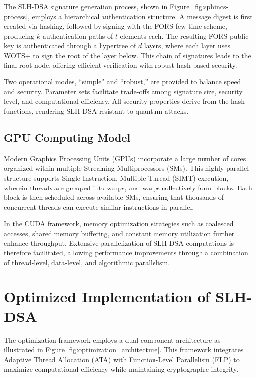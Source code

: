 \documentclass[journal]{IEEEtran}
\begin{document}
The SLH-DSA signature generation process, shown in Figure~\ref{fig:sphincs-process}, employs a hierarchical authentication structure. A message digest is first created via hashing, followed by signing with the FORS few-time scheme, producing $k$ authentication paths of $t$ elements each. The resulting FORS public key is authenticated through a hypertree of $d$ layers, where each layer uses WOTS+ to sign the root of the layer below. This chain of signatures leads to the final root node, offering efficient verification with robust hash-based security.

Two operational modes, “simple” and “robust,” are provided to balance speed and security. Parameter sets facilitate trade-offs among signature size, security level, and computational efficiency. All security properties derive from the hash functions, rendering SLH-DSA resistant to quantum attacks.

\subsection{GPU Computing Model}

Modern Graphics Processing Units (GPUs) incorporate a large number of cores organized within multiple Streaming Multiprocessors (SMs). This highly parallel structure supports Single Instruction, Multiple Thread (SIMT) execution, wherein threads are grouped into warps, and warps collectively form blocks. Each block is then scheduled across available SMs, ensuring that thousands of concurrent threads can execute similar instructions in parallel.

In the CUDA framework, memory optimization strategies such as coalesced accesses, shared memory buffering, and constant memory utilization further enhance throughput. Extensive parallelization of SLH-DSA computations is therefore facilitated, allowing performance improvements through a combination of thread-level, data-level, and algorithmic parallelism.

\section{Optimized Implementation of SLH-DSA}\label{sec:implementation}



The optimization framework employs a dual-component architecture as illustrated in Figure \ref{fig:optimization_architecture}. This framework integrates Adaptive Thread Allocation (ATA) with Function-Level Parallelism (FLP) to maximize computational efficiency while maintaining cryptographic integrity.
\end{document}
